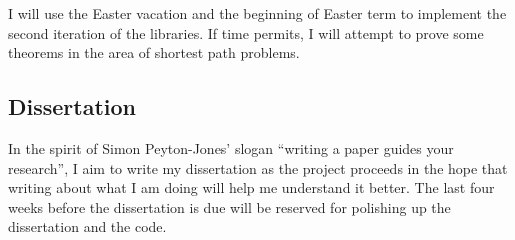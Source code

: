 \documentclass[a4paper]{scrartcl}
\begin{document}
I will use the Easter vacation and the beginning of Easter term to implement the second iteration of the libraries. If time permits, I will attempt to prove some theorems in the area of shortest path problems.

\subsection{Dissertation}

In the spirit of Simon Peyton-Jones' slogan \enquote{writing a paper guides your research}, I aim to write my dissertation as the project proceeds in the hope that writing about what I am doing will help me understand it better. The last four weeks before the dissertation is due will be reserved for polishing up the dissertation and the code.

\printbibliography
\end{document}
